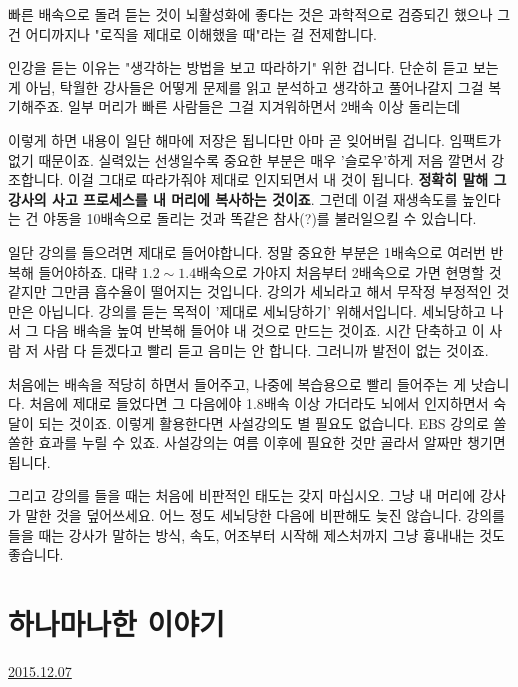 빠른 배속으로 돌려 듣는 것이 뇌활성화에 좋다는 것은 과학적으로 검증되긴 했으나
그건 어디까지나 "로직을 제대로 이해했을 때"라는 걸 전제합니다.
\vspace{5mm}

인강을 듣는 이유는 "생각하는 방법을 보고 따라하기" 위한 겁니다.
단순히 듣고 보는 게 아님, 탁월한 강사들은 어떻게 문제를 읽고 분석하고 생각하고 풀어나갈지 그걸 복기해주죠.
일부 머리가 빠른 사람들은 그걸 지겨워하면서 2배속 이상 돌리는데
\vspace{5mm}

이렇게 하면 내용이 일단 해마에 저장은 됩니다만 아마 곧 잊어버릴 겁니다. 임팩트가 없기 때문이죠.
실력있는 선생일수록 중요한 부분은 매우 '슬로우'하게 저음 깔면서 강조합니다.
이걸 그대로 따라가줘야 제대로 인지되면서 내 것이 됩니다. \textbf{정확히 말해 그 강사의 사고 프로세스를 내 머리에 복사하는 것이죠}.
그런데 이걸 재생속도를 높인다는 건 야동을 10배속으로 돌리는 것과 똑같은 참사(?)를 불러일으킬 수 있습니다.
\vspace{5mm}

일단 강의를 들으려면 제대로 들어야합니다. 정말 중요한 부분은 1배속으로 여러번 반복해 들어야하죠.
대략 $1.2\sim1.4$배속으로 가야지 처음부터 2배속으로 가면 현명할 것 같지만 그만큼 흡수율이 떨어지는 것입니다.
강의가 세뇌라고 해서 무작정 부정적인 것만은 아닙니다. 강의를 듣는 목적이 '제대로 세뇌당하기' 위해서입니다.
세뇌당하고 나서 그 다음 배속을 높여 반복해 들어야 내 것으로 만드는 것이죠.
시간 단축하고 이 사람 저 사람 다 듣겠다고 빨리 듣고 음미는 안 합니다. 그러니까 발전이 없는 것이죠.
\vspace{5mm}

처음에는 배속을 적당히 하면서 들어주고, 나중에 복습용으로 빨리 들어주는 게 낫습니다.
처음에 제대로 들었다면 그 다음에야 1.8배속 이상 가더라도 뇌에서 인지하면서 숙달이 되는 것이죠.
이렇게 활용한다면 사설강의도 별 필요도 없습니다. EBS 강의로 쏠쏠한 효과를 누릴 수 있죠.
사설강의는 여름 이후에 필요한 것만 골라서 알짜만 챙기면 됩니다.
\vspace{5mm}

그리고 강의를 들을 때는 처음에 비판적인 태도는 갖지 마십시오. 그냥 내 머리에 강사가 말한 것을 덮어쓰세요.
어느 정도 세뇌당한 다음에 비판해도 늦진 않습니다.
강의를 들을 때는 강사가 말하는 방식, 속도, 어조부터 시작해 제스처까지 그냥 흉내내는 것도 좋습니다.
\vspace{5mm}






\section{하나마나한 이야기}
\href{https://www.kockoc.com/Apoc/531614}{2015.12.07}

